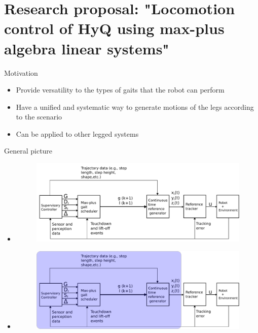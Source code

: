\documentclass[10pt]{beamer}
\begin{document}
\section{Research proposal: "Locomotion control of HyQ using max-plus algebra linear systems"}

\begin{frame}{Motivation}
	\begin{itemize}\setlength\itemsep{3em}
		\item Provide versatility to the types of gaits that the robot can perform
		\item Have a unified and systematic way to generate motions of the legs according to the scenario
		\item Can be applied to other legged systems
	\end{itemize}
\end{frame}

\begin{frame}{General picture}	
	\begin{itemize}[notitemsep, topsep=0pt]
		\item <1|only@1> [] 
		\begin{figure}[ht]\centering
			\hspace{-25pt}\includegraphics[width=1\textwidth]{images/ControlStrategy.pdf}
		\end{figure}
		\item <2|only@2> [] 
		\begin{figure}[ht]\centering
			\hspace{-25pt}\includegraphics[width=1\textwidth]{images/ControlStrategy1.pdf}
		\end{figure}
	\end{itemize}
\end{frame}
\end{document}
